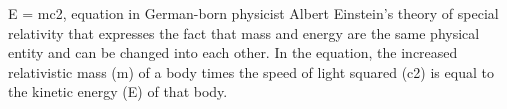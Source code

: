 E = mc2, 
equation in German-born physicist Albert Einstein’s theory of special relativity that expresses the fact that mass and energy are the same physical entity and can be changed into each other. In the equation, the increased relativistic mass (m) of a body times the speed of light squared (c2) is equal to the kinetic energy (E) of that body.
